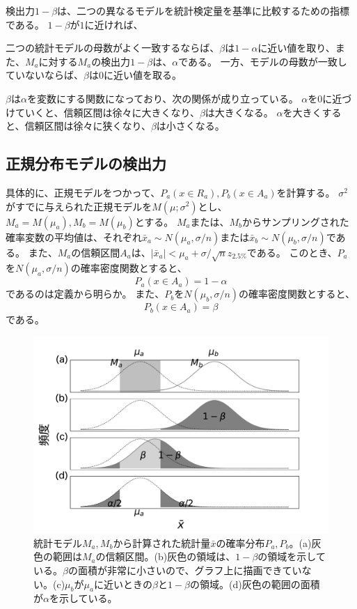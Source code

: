 検出力$1-\beta$は、二つの異なるモデルを統計検定量を基準に比較するための指標である。
$1-\beta$が$1$に近ければ、

二つの統計モデルの母数がよく一致するならば、$\beta$は$1-\alpha$に近い値を取り、また、$M_a$に対する$M_a$の検出力$1-\beta$は、$\alpha$である。
一方、モデルの母数が一致していないならば、$\beta$は0に近い値を取る。

$\beta$は$\alpha$を変数にする関数になっており、次の関係が成り立っている。
$\alpha$を0に近づけていくと、信頼区間は徐々に大きくなり、$\beta$は大きくなる。
$\alpha$を大きくすると、信頼区間は徐々に狭くなり、$\beta$は小さくなる。



\subsection{正規分布モデルの検出力}
具体的に、正規モデルをつかって、$P_a(x \in R_a),P_b(x \in A_a)$を計算する。
$\sigma^2$がすでに与えられた正規モデルを$M(\mu;\sigma^2)$とし、$M_a=M(\mu_a),M_b=M(\mu_b)$とする。
$M_a$または、$M_b$からサンプリングされた確率変数の平均値は、それぞれ$\bar{x}_a\sim N(\mu_a,\sigma/n)$または$\bar{x}_b\sim N(\mu_b,\sigma/n)$である。
また、$M_a$の信頼区間$A_a$は、$|\bar{x}_a|<\mu_a+\sigma / \sqrt{n}z_{2.5\%}$である。
このとき、$P_a$を$N(\mu_a,\sigma/n)$の確率密度関数とすると、
\begin{equation*}
    P_a(x \in A_a) = 1-\alpha
\end{equation*}
であるのは定義から明らか。
また、$P_b$を$N(\mu_b,\sigma/n)$の確率密度関数とすると、
\begin{equation*}
    P_b(x \in A_a ) = \beta
\end{equation*}
である。


\begin{figure}
\begin{center}
 \includegraphics[width=15cm]{./image/04_/power_of_a_test_2.pdf}
 \caption{統計モデル$M_a,M_b$から計算された統計量$\bar{x}$の確率分布$P_a,P_b$。(a)灰色の範囲は$M_a$の信頼区間。(b)灰色の領域は、$1-\beta$の領域を示している。$\beta$の面積が非常に小さいので、グラフ上に描画できていない。(c)$\mu_b$が$\mu_a$に近いときの$\beta$と$1-\beta$の領域。(d)灰色の範囲の面積が$\alpha$を示している。}
 \label{fig:power_of_test_alpha_beta}
\end{center}
\end{figure}


